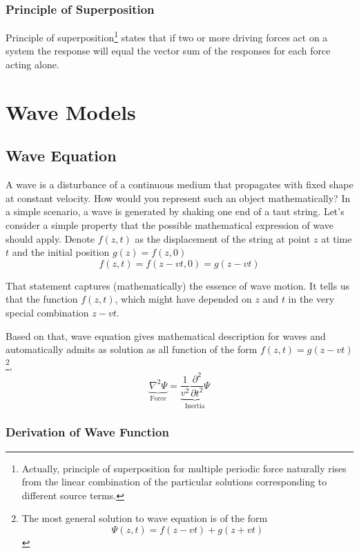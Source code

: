 \documentclass[openany]{book}
\begin{document}
\subsection{Principle of Superposition}
Principle of superposition\footnote{Actually, principle of superposition for multiple periodic force naturally rises from the linear combination of the particular solutions corresponding to different source terms.} states that if two or more driving forces act on a system the response will equal the vector sum of the responses for each force acting alone.

\chapter{Wave Models}
\section{Wave Equation}
A wave is a disturbance of a continuous medium that propagates with fixed shape at constant velocity. How would you represent such an object mathematically? In a simple scenario, a wave is generated by shaking one end of a taut
string. Let's consider a simple property that the possible mathematical expression of wave should apply. Denote $f(z,t)$ as the displacement of the string at point $z$ at time $t$ and the initial position $g(z)=f(z,0)$
\[f(z,t)=f(z-vt,0)=g(z-vt)\]

That statement captures (mathematically) the essence of wave motion. It tells us that the function $f(z, t)$, which might have depended on $z$ and $t$ in the very special combination $z-vt$.

Based on that, wave equation gives mathematical description for waves and automatically admits as solution as all function of the form $f(z,t)=g(z-vt)$\footnote{The most general solution to wave equation is of the form
\[\Psi (z,t)=f(z-vt)+g(z+vt)\]},
\begin{equation}\label{eq:6}
\underbrace{\nabla ^2\Psi }_\text{Force}=\underbrace{\frac{1}{v^2}\frac{\partial ^2}{\partial t^2}\Psi}_\text{Inertia}
\end{equation}

\subsection{Derivation of Wave Function}
\end{document}
